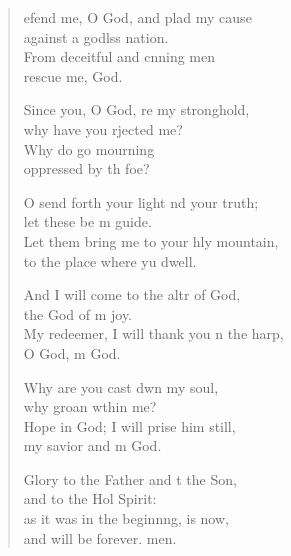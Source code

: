 \settowidth{\versewidth}{Let them bring me to your holy mountain}
\begin{verse}%
  \begin{patverse}
    efend me, O God, and plad my cause\Med\\
against a godlss nation.\\
From deceitful and cnning men\Med\\
rescue me,  God.

Since you, O God, re my stronghold,\Med\\
why have you rjected me?\\
Why do  go mourning\Med\\
oppressed by th foe?

O send forth your light nd your truth;\Med\\
let these be m guide.\\
Let them bring me to your hly mountain,\Med\\
to the place where yu dwell.

And I will come to the altr of God,\Med\\
the God of m joy.\\
My redeemer, I will thank you n the harp,\Med\\
O God, m God.

Why are you cast dwn my soul,\Med\\
why groan w\pointup{\i}thin me?\\
Hope in God; I will prise him still,\Med\\
my savior and m God.

Glory to the Father and t the Son,\Med\\
and to the Hol Spirit:\\
as it was in the beginn\pointup{\i}ng, is now,\Med\\
and will be forever. men.
  \end{patverse}
\end{verse}
